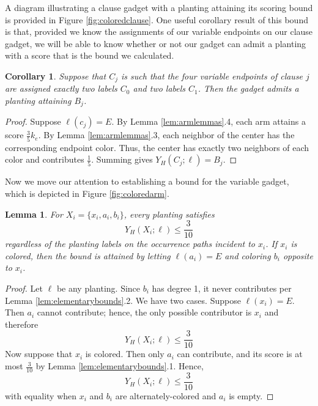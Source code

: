 \documentclass[11pt]{article}
\theoremstyle{plain}
\newtheorem{lemma}[theorem]{Lemma}
\newtheorem{corollary}[theorem]{Corollary}
\begin{document}
A diagram illustrating a clause gadget with a planting attaining its scoring bound is provided in Figure \ref{fig:coloredclause}. One useful corollary result of this bound is that, provided we know the assignments of our variable endpoints on our clause gadget, we will be able to know whether or not our gadget can admit a planting with a score that is the bound we calculated.

\begin{corollary} \label{cor:optplantcond}
    Suppose that $C_j$ is such that the four variable endpoints of clause $j$ are assigned exactly two labels $C_0$ and two labels $C_1$. Then the gadget admits a planting attaining $B_j$.
\end{corollary}

\begin{proof}
    Suppose $\ell(c_j) = E$. By Lemma \ref{lem:armlemmas}.4, each arm attains a score $\frac{3}{5}k_e$. By Lemma \ref{lem:armlemmas}.3, each neighbor of the center has the corresponding endpoint color. Thus, the center has exactly two neighbors of each color and contributes $\frac{1}{5}$. Summing gives $Y_H(C_j;\ell)=B_j$.
\end{proof}

Now we move our attention to establishing a bound for the variable gadget, which is depicted in Figure \ref{fig:coloredarm}. 

\begin{lemma} \label{lem:tailbound}
    For $X_i = \{x_i, a_i, b_i\}$, every planting satisfies 
    \[Y_H (X_i; \ell) \leq \frac{3}{10}\]
    regardless of the planting labels on the occurrence paths incident to $x_i$. If $x_i$ is colored, then the bound is attained by letting $\ell(a_i) = E$ and coloring $b_i$ opposite to $x_i$.
\end{lemma}

\begin{proof}
    Let $\ell$ be any planting. Since $b_i$ has degree 1, it never contributes per Lemma \ref{lem:elementarybounds}.2. We have two cases. Suppose $\ell(x_i) = E$. Then $a_i$ cannot contribute; hence, the only possible contributor is $x_i$ and therefore
    \[Y_H (X_i; \ell) \leq \frac{3}{10}\]
    Now suppose that $x_i$ is colored. Then only $a_i$ can contribute, and its score is at most $\frac{3}{10}$ by Lemma \ref{lem:elementarybounds}.1. Hence, 
    \[Y_H (X_i; \ell) \leq \frac{3}{10}\]
    with equality when $x_i$ and $b_i$ are alternately-colored and $a_i$ is empty. 
\end{proof}
\end{document}
